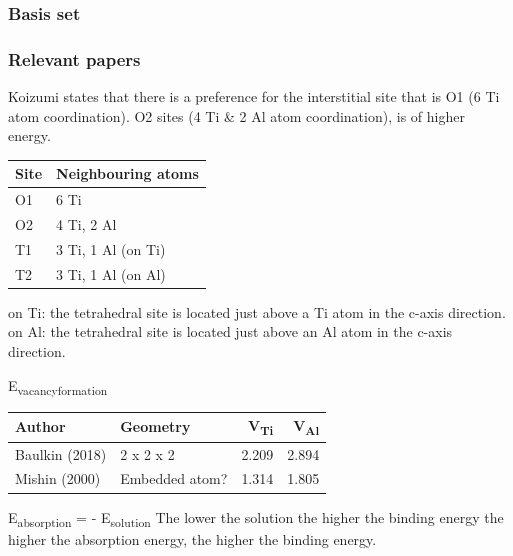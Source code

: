 \documentclass[11pt]{article}
\begin{document}
\subsubsection{Basis set}
\label{sec:org5f84dfc}


\subsubsection{Relevant papers}
\label{sec:org9565b3c}
\cite{bakulin17_absor_diffus_oxygen_ti3al_alloy} 

\cite{wei11_effec_o_binar_phase_tial_ti3al_alloy}

\cite{bakulin18_effec_impur_format_energ_point}

\cite{mishin00_diffus_ti_al_system}

\cite{koizumi08_oxygen_diffus_ti3al_singl_cryst}




Koizumi states that there is a preference for the interstitial site that is O1
(6 Ti atom coordination). O2 sites (4 Ti \& 2 Al atom coordination), is of higher
energy. 

\begin{center}
\begin{tabular}{ll}
Site & Neighbouring atoms\\
\hline
O1 & 6 Ti\\
O2 & 4 Ti, 2 Al\\
T1 & 3 Ti, 1 Al (on Ti)\\
T2 & 3 Ti, 1 Al (on Al)\\
\end{tabular}
\end{center}

on Ti: the tetrahedral site is located just above a Ti atom in the c-axis direction.
on Al: the tetrahedral site is located just above an Al atom in the c-axis direction.



E\textsubscript{vacancy}\textsubscript{formation}
\begin{center}
\begin{tabular}{llrr}
Author & Geometry & V\textsubscript{Ti} & V\textsubscript{Al}\\
\hline
Baulkin (2018) & 2 x 2 x 2 & 2.209 & 2.894\\
Mishin  (2000) & Embedded atom? & 1.314 & 1.805\\
\end{tabular}
\end{center}


E\textsubscript{absorption} = - E\textsubscript{solution} 
The lower the solution the higher the binding energy 
the higher the absorption energy, the higher the binding energy. 
\end{document}

